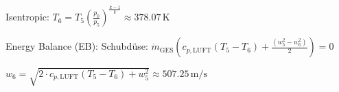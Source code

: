 Isentropic:  
\( T_6 = T_5 \left( \frac{p_0}{p_5} \right)^{\frac{k-1}{k}} \approx 378.07 \, \text{K} \)  

Energy Balance (EB):  
Schubdüse:  
\( \dot{m}_{\text{GES}} \left( c_{p,\text{LUFT}} \left( T_5 - T_6 \right) + \frac{\left( w_5^2 - w_6^2 \right)}{2} \right) = 0 \)  

\( w_6 = \sqrt{2 \cdot c_{p,\text{LUFT}} \left( T_5 - T_6 \right) + w_5^2} \approx 507.25 \, \text{m/s} \)